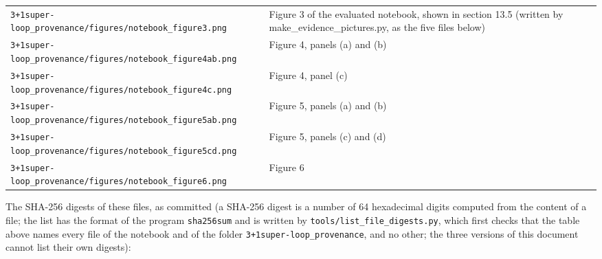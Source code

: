 \documentclass[
  10pt,
]{article}
\begin{document}
\begin{longtable}[]{@{}
  >{\raggedright\arraybackslash}p{}
  >{\raggedright\arraybackslash}p{}@{}}
\texttt{3+1super-loop\_provenance/figures/notebook\_figure3.png} &
Figure 3 of the evaluated notebook, shown in section 13.5 (written by
make\_evidence\_pictures.py, as the five files below) \\
\texttt{3+1super-loop\_provenance/figures/notebook\_figure4ab.png} &
Figure 4, panels (a) and (b) \\
\texttt{3+1super-loop\_provenance/figures/notebook\_figure4c.png} &
Figure 4, panel (c) \\
\texttt{3+1super-loop\_provenance/figures/notebook\_figure5ab.png} &
Figure 5, panels (a) and (b) \\
\texttt{3+1super-loop\_provenance/figures/notebook\_figure5cd.png} &
Figure 5, panels (c) and (d) \\
\texttt{3+1super-loop\_provenance/figures/notebook\_figure6.png} &
Figure 6 \\
\end{longtable}

The SHA-256 digests of these files, as committed (a SHA-256 digest is a
number of 64 hexadecimal digits computed from the content of a file; the
list has the format of the program \texttt{sha256sum} and is written by
\texttt{tools/list\_file\_digests.py}, which first checks that the table
above names every file of the notebook and of the folder
\texttt{3+1super-loop\_provenance}, and no other; the three versions of
this document cannot list their own digests):
\end{document}
